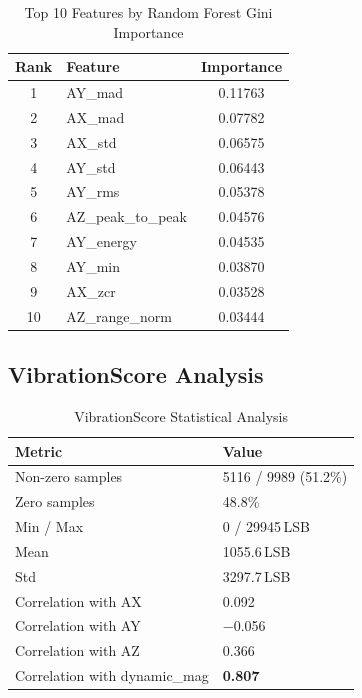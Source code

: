 \documentclass[12pt,a4paper]{report}
\begin{document}
\begin{table}[H]
  \centering
  \caption{Top 10 Features by Random Forest Gini Importance}
  \label{tab:feat_imp}
  \begin{tabular}{clc}
    \toprule
    \textbf{Rank} & \textbf{Feature} & \textbf{Importance} \\
    \midrule
    1  & AY\_mad              & 0.11763 \\
    2  & AX\_mad              & 0.07782 \\
    3  & AX\_std              & 0.06575 \\
    4  & AY\_std              & 0.06443 \\
    5  & AY\_rms              & 0.05378 \\
    6  & AZ\_peak\_to\_peak   & 0.04576 \\
    7  & AY\_energy           & 0.04535 \\
    8  & AY\_min              & 0.03870 \\
    9  & AX\_zcr              & 0.03528 \\
    10 & AZ\_range\_norm      & 0.03444 \\
    \bottomrule
  \end{tabular}
\end{table}

\subsection{VibrationScore Analysis}

\begin{table}[H]
  \centering
  \caption{VibrationScore Statistical Analysis}
  \label{tab:vs}
  \begin{tabular}{ll}
    \toprule
    \textbf{Metric} & \textbf{Value} \\
    \midrule
    Non-zero samples         & 5116 / 9989 (51.2\%) \\
    Zero samples             & 48.8\% \\
    Min / Max                & 0 / 29945\,LSB \\
    Mean                     & 1055.6\,LSB \\
    Std                      & 3297.7\,LSB \\
    Correlation with AX      & 0.092 \\
    Correlation with AY      & $-$0.056 \\
    Correlation with AZ      & 0.366 \\
    Correlation with dynamic\_mag & \textbf{0.807} \\
    \bottomrule
  \end{tabular}
\end{table}
\end{document}
